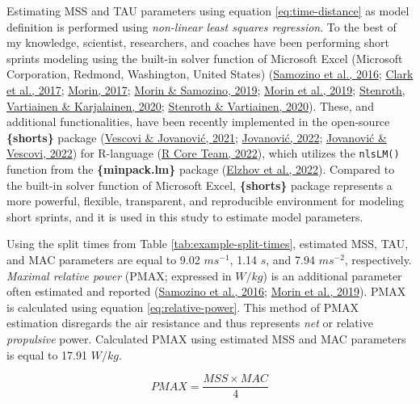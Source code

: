 \documentclass[fleqn,10pt,lineno]{wlpeerj} %
\begin{document}
Estimating MSS and TAU parameters using equation \eqref{eq:time-distance} as model definition is performed using \emph{non-linear least squares regression}. To the best of my knowledge, scientist, researchers, and coaches have been performing short sprints modeling using the built-in solver function of Microsoft Excel (Microsoft Corporation, Redmond, Washington, United States) (\protect\hyperlink{ref-samozinoSimpleMethodMeasuring2016}{Samozino et al., 2016}; \protect\hyperlink{ref-clarkNFLCombine40Yard2017}{Clark et al., 2017}; \protect\hyperlink{ref-morinSpreadsheetSprintAcceleration2017}{Morin, 2017}; \protect\hyperlink{ref-morinSpreadsheetSprintAcceleration2019}{Morin \& Samozino, 2019}; \protect\hyperlink{ref-morinSimpleMethodComputing2019}{Morin et al., 2019}; \protect\hyperlink{ref-stenrothForcevelocityProfilingIce2020}{Stenroth, Vartiainen \& Karjalainen, 2020}; \protect\hyperlink{ref-stenrothSpreadsheetSprintAcceleration2020}{Stenroth \& Vartiainen, 2020}). These, and additional functionalities, have been recently implemented in the open-source \textbf{\{shorts\}} package (\protect\hyperlink{ref-vescoviSprintMechanicalCharacteristics2021}{Vescovi \& Jovanović, 2021}; \protect\hyperlink{ref-R-shorts}{Jovanović, 2022}; \protect\hyperlink{ref-jovanovic2022}{Jovanović \& Vescovi, 2022}) for R-language (\protect\hyperlink{ref-R-base}{R Core Team, 2022}), which utilizes the \texttt{nlsLM()} function from the \textbf{\{minpack.lm\}} package (\protect\hyperlink{ref-R-minpack.lm}{Elzhov et al., 2022}). Compared to the built-in solver function of Microsoft Excel, \textbf{\{shorts\}} package represents a more powerful, flexible, transparent, and reproducible environment for modeling short sprints, and it is used in this study to estimate model parameters.

Using the split times from Table \ref{tab:example-split-times}, estimated MSS, TAU, and MAC parameters are equal to 9.02 \(ms^{-1}\), 1.14 \(s\), and 7.94 \(ms^{-2}\), respectively. \emph{Maximal relative power} (PMAX; expressed in \(W/kg\)) is an additional parameter often estimated and reported (\protect\hyperlink{ref-samozinoSimpleMethodMeasuring2016}{Samozino et al., 2016}; \protect\hyperlink{ref-morinSimpleMethodComputing2019}{Morin et al., 2019}). PMAX is calculated using equation \eqref{eq:relative-power}. This method of PMAX estimation disregards the air resistance and thus represents \emph{net} or relative \emph{propulsive} power. Calculated PMAX using estimated MSS and MAC parameters is equal to 17.91 \(W/kg\).

\begin{equation}
  PMAX = \frac{MSS \times MAC}{4} \label{eq:relative-power}
\end{equation}
\end{document}
